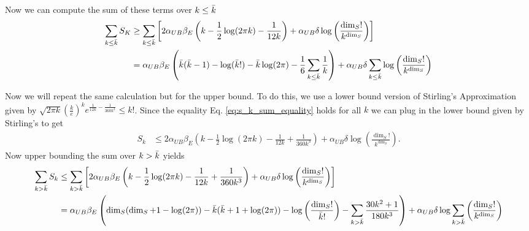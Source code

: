 \documentclass{article}
\newcommand{\parens}[1]{\left( #1 \right)}
\begin{document}
Now we can compute the sum of these terms over $k \leq \Bar{k}$
\begin{align}
    \sum_{k \leq \Bar{k}} S_K & \geq \sum_{k \leq \Bar{k}} \left[ 2 \alpha_{UB} \beta_E \parens{k -\frac{1}{2} \log(2 \pi k) - \frac{1}{12 k}}  + \alpha_{UB} \delta \log \parens{\frac{\dim_S!}{k^{\dim_S}}} \right] \\
&= \alpha_{UB} \beta_E \parens{\Bar{k} (\Bar{k} - 1) -\log (\Bar{k}!) - \Bar{k} \log(2 \pi) - \frac{1}{6} \sum_{k \leq \Bar{k}} \frac{1}{k}} + \alpha_{UB} \delta \sum_{k \leq \Bar{k}} \log \parens{\frac{\dim_S!}{k^{\dim_S}}}
\end{align}

Now we will repeat the same calculation but for the upper bound. To do this, we use a lower bound version of Stirling's Approximation given by $\sqrt{2 \pi k} \parens{\frac{k}{e}}^k e^{\frac{1}{12k} - \frac{1}{360k^3}} \leq k!$. Since the equality Eq. \eqref{eq:s_k_sum_equality} holds for all $k$ we can plug in the lower bound given by Stirling's to get
\begin{align}
    S_k & \leq 2 \alpha_{UB} \beta_E \parens{k -\frac{1}{2}\log (2 \pi k) - \frac{1}{12k} + \frac{1}{360 k^3}} + \alpha_{UB} \delta \log \parens{\frac{\dim_S!}{k^{\dim_S}}}.
\end{align}
Now upper bounding the sum over $k > \Bar{k}$ yields 
\begin{align}
     \sum_{k > \Bar{k}} S_k &\leq \sum_{k > \Bar{k}} \left[ 2 \alpha_{UB} \beta_E \parens{k -\frac{1}{2}\log (2 \pi k) - \frac{1}{12k} + \frac{1}{360 k^3}} + \alpha_{UB} \delta \log \parens{\frac{\dim_S!}{k^{\dim_S}}} \right] \\
     &= \alpha_{UB} \beta_E \parens{ \dim_S (\dim_S + 1 - \log(2 \pi)) - \Bar{k} (\Bar{k} +1 + \log(2 \pi)) - \log \parens{\frac{\dim_S!  }{\Bar{k}!}} - \sum_{k > \Bar{k}} \frac{30 k^2 + 1}{180 k^3}} + \alpha_{UB} \delta \log \sum_{k > \Bar{k}} \parens{\frac{\dim_S!}{k^{\dim_S}}}
\end{align}
\end{document}
